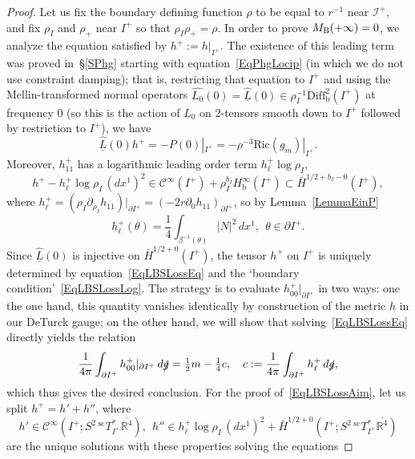\documentclass[reqno,11pt,letterpaper]{amsart}
\numberwithin{equation}{section}
\numberwithin{figure}{section}
\theoremstyle{definition}
\theoremstyle{remark}
\newcommand{\mc}{\mathcal}
\newcommand{\cC}{\mc C}
\newcommand{\ms}{\mathscr}
\newcommand{\scri}{\ms I}
\newcommand{\R}{\mathbb{R}}
\newcommand{\slg}{\slashed{g}{}}
\newcommand{\ol}{\overline}
\newcommand{\pa}{\partial}
\newcommand{\ul}[1]{\underline{#1}{}}
\newcommand{\wh}{\widehat}
\newcommand{\bop}{{\mathrm{b}}}
\newcommand{\scl}{{\mathrm{sc}}}
\newcommand{\Diff}{\mathrm{Diff}}
\newcommand{\Diffb}{\Diff_\bop}
\newcommand{\Tsc}{{}^{\scl}T}
\newcommand{\half}{\tfrac{1}{2}}
\newcommand{\CI}{\cC^\infty}
\newcommand{\Hb}{H_{\bop}}
\newcommand{\Hext}{\bar H}
\newcommand{\Ric}{\mathrm{Ric}}
\begin{document}
\begin{proof}
  Let us fix the boundary defining function $\rho$ to be equal to $r^{-1}$ near $\scri^+$, and fix $\rho_I$ and $\rho_+$ near $I^+$ so that $\rho_I\rho_+=\rho$. In order to prove $M_{\rm B}(+\infty)=0$, we analyze the equation satisfied by $h^+:=h|_{I^+}$. The existence of this leading term was proved in~\S\ref{SPhg} starting with equation~\eqref{EqPhgLocip} (in which we do not use constraint damping); that is, restricting that equation to $I^+$ and using the Mellin-transformed normal operators $\wh{L_0}(0)=\wh{\ul L}(0)\in\rho_I^{-1}\Diffb^2(I^+)$ at frequency $0$ (so this is the action of $L_0$ on 2-tensors smooth down to $I^+$ followed by restriction to $I^+$), we have
  \begin{equation}
  \label{EqLBSLossEq}
    \wh{\ul L}(0) h^+ = -P(0)|_{I^+} = -\rho^{-3}\Ric(g_m)|_{I^+}.
  \end{equation}
  Moreover, $h^+_{1 1}$ has a logarithmic leading order term $h^+_\ell\log\rho_I$,
  \begin{equation}
  \label{EqLBSLossLog}
    h^+-h^+_\ell\log\rho_I\,(d x^1)^2 \in\CI(I^+)+\rho_I^{b_I}\Hb^\infty(I^+)\subset\Hext^{1/2+b_I-0}(I^+),
  \end{equation}
  where $h^+_\ell=(\rho_I\pa_{\rho_I}h_{1 1})|_{\pa I^+}=(-2 r\pa_0 h_{1 1})_{\pa I^+}$, so by Lemma~\ref{LemmaEinP}
  \[
    h_\ell^+(\theta) = \frac14 \int_{\beta^{-1}(\theta)} |N|^2\,d x^1,\ \ \theta\in\pa I^+.
  \]
  Since $\wh{\ul L}(0)$ is injective on $\Hext^{1/2+0}(I^+)$, the tensor $h^+$ on $I^+$ is uniquely determined by equation~\eqref{EqLBSLossEq} and the `boundary condition'~\eqref{EqLBSLossLog}. The strategy is to evaluate $h^+_{0 0}|_{\pa I^+}$ in two ways: one the one hand, this quantity vanishes identically by construction of the metric $h$ in our DeTurck gauge; on the other hand, we will show that solving~\eqref{EqLBSLossEq} directly yields the relation
  \begin{equation}
  \label{EqLBSLossAim}
    \frac{1}{4\pi}\int_{\pa I^+} h^+_{0 0}|_{\pa I^+}\,d\slg = \half m - \tfrac14 c, \quad c:=\frac{1}{4\pi}\int_{\pa I^+} h^+_\ell\,d\slg,
  \end{equation}
  which thus gives the desired conclusion. For the proof of~\eqref{EqLBSLossAim}, let us split $h^+=h'+h''$, where
  \begin{equation}
  \label{EqLBSLossMinkBC}
    h'\in\CI(I^+;S^2\,\Tsc^*_{I^+}\ol{\R^4}),\ \ 
    h''\in h^+_\ell\log\rho_I\,(d x^1)^2 + \Hext^{1/2+0}(I^+;S^2\,\Tsc^*_{I^+}\ol{\R^4})
  \end{equation}
  are the unique solutions with these properties solving the equations

\end{proof}
\end{document}
